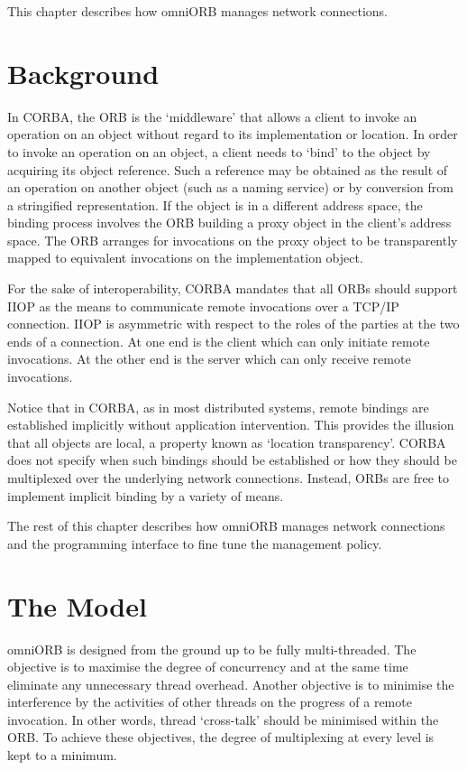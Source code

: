 \documentclass[11pt,twoside,a4paper]{book}
\begin{document}
This chapter describes how omniORB manages network connections.

\section{Background}

In CORBA, the ORB is the `middleware' that allows a client to invoke
an operation on an object without regard to its implementation or
location. In order to invoke an operation on an object, a client needs
to `bind' to the object by acquiring its object reference. Such a
reference may be obtained as the result of an operation on another
object (such as a naming service) or by conversion from a stringified
representation. If the object is in a different address space, the
binding process involves the ORB building a proxy object in the
client's address space. The ORB arranges for invocations on the proxy
object to be transparently mapped to equivalent invocations on the
implementation object.

For the sake of interoperability, CORBA mandates that all ORBs should
support IIOP as the means to communicate remote invocations over a
TCP/IP connection. IIOP is asymmetric with respect to the roles of the
parties at the two ends of a connection. At one end is the client
which can only initiate remote invocations. At the other end is the
server which can only receive remote invocations.

Notice that in CORBA, as in most distributed systems, remote bindings
are established implicitly without application intervention. This
provides the illusion that all objects are local, a property known as
`location transparency'. CORBA does not specify when such bindings
should be established or how they should be multiplexed over the
underlying network connections. Instead, ORBs are free to implement
implicit binding by a variety of means.

The rest of this chapter describes how omniORB manages network
connections and the programming interface to fine tune the management
policy.

\section{The Model}

omniORB is designed from the ground up to be fully multi-threaded. The
objective is to maximise the degree of concurrency and at the same
time eliminate any unnecessary thread overhead. Another objective is
to minimise the interference by the activities of other threads on the
progress of a remote invocation. In other words, thread `cross-talk'
should be minimised within the ORB. To achieve these objectives, the
degree of multiplexing at every level is kept to a minimum.
\end{document}
